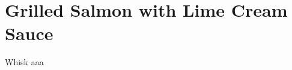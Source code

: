 \section{Grilled Salmon with Lime Cream Sauce}
\begin{recipe}

	\pre{}



	Whisk aaa


\end{recipe}

